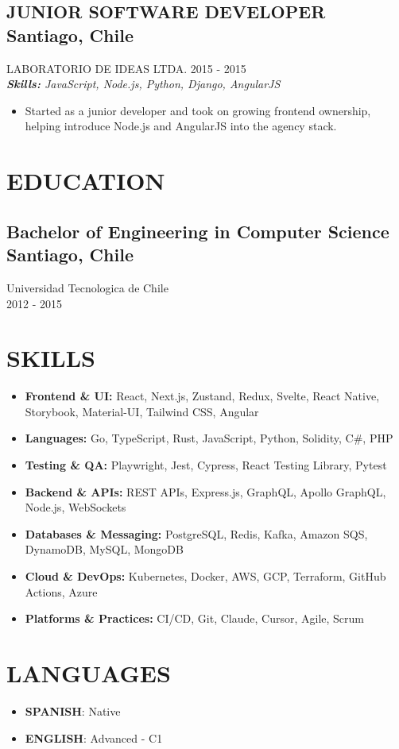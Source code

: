 \documentclass{article}
\newcommand{\SubHeading}[1]{
   \subsection*{#1}\vspace{-0.5em}
}
\newcommand{\WorkExperience}[2]{
   \subsection*{#1}
   \vspace{-1em}
   \uppercase{#2}
}
\newcommand{\Skills}[1]{
   \textit{\textbf{Skills:} #1}
}
\begin{document}
\WorkExperience{JUNIOR SOFTWARE DEVELOPER \hfill Santiago, Chile}{Laboratorio de Ideas Ltda. \hfill 2015 {-} 2015} \\
\Skills{JavaScript, Node.js, Python, Django, AngularJS}
\begin{itemize}
	\item Started as a junior developer and took on growing frontend ownership, helping introduce Node.js and AngularJS into the agency stack.
\end{itemize}

\section*{EDUCATION}
\SubHeading{Bachelor of Engineering in Computer Science \hfill Santiago, Chile}
Universidad Tecnologica de Chile \\[0.1em]
2012 {-} 2015

\section*{SKILLS}
\begin{itemize}
	\item \textbf{Frontend \& UI:} React, Next.js, Zustand, Redux, Svelte, React Native, Storybook, Material-UI, Tailwind CSS, Angular
	\item \textbf{Languages:} Go, TypeScript, Rust, JavaScript, Python, Solidity, C\#, PHP
	\item \textbf{Testing \& QA:} Playwright, Jest, Cypress, React Testing Library, Pytest
	\item \textbf{Backend \& APIs:} REST APIs, Express.js, GraphQL, Apollo GraphQL, Node.js, WebSockets
	\item \textbf{Databases \& Messaging:} PostgreSQL, Redis, Kafka, Amazon SQS, DynamoDB, MySQL, MongoDB
	\item \textbf{Cloud \& DevOps:} Kubernetes, Docker, AWS, GCP, Terraform, GitHub Actions, Azure
	\item \textbf{Platforms \& Practices:} CI/CD, Git, Claude, Cursor, Agile, Scrum
\end{itemize}

\section*{LANGUAGES}
\begin{itemize}[left=0pt]
	\item \textbf{SPANISH}: Native
	\item \textbf{ENGLISH}: Advanced {-} C1
\end{itemize}
\end{document}
